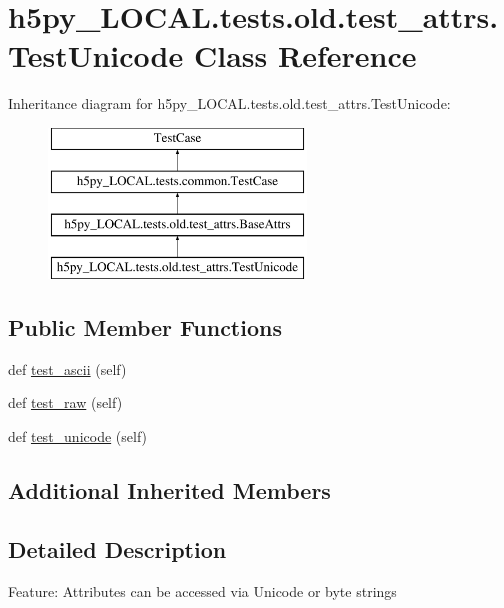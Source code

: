 \hypertarget{classh5py__LOCAL_1_1tests_1_1old_1_1test__attrs_1_1TestUnicode}{}\section{h5py\+\_\+\+L\+O\+C\+A\+L.\+tests.\+old.\+test\+\_\+attrs.\+Test\+Unicode Class Reference}
\label{classh5py__LOCAL_1_1tests_1_1old_1_1test__attrs_1_1TestUnicode}
Inheritance diagram for h5py\+\_\+\+L\+O\+C\+A\+L.\+tests.\+old.\+test\+\_\+attrs.\+Test\+Unicode\+:\begin{figure}[H]
\begin{center}
\leavevmode
\includegraphics[height=4.000000cm]{classh5py__LOCAL_1_1tests_1_1old_1_1test__attrs_1_1TestUnicode}
\end{center}
\end{figure}
\subsection*{Public Member Functions}
\begin{DoxyCompactItemize}
\item 
def \hyperlink{classh5py__LOCAL_1_1tests_1_1old_1_1test__attrs_1_1TestUnicode_a189654c1ae6760256cca4e8e3fdc5495}{test\+\_\+ascii} (self)
\item 
def \hyperlink{classh5py__LOCAL_1_1tests_1_1old_1_1test__attrs_1_1TestUnicode_aac970736ab9c2e8dd90d5afc500c8245}{test\+\_\+raw} (self)
\item 
def \hyperlink{classh5py__LOCAL_1_1tests_1_1old_1_1test__attrs_1_1TestUnicode_a377e19245412a821912406c9d54c92cd}{test\+\_\+unicode} (self)
\end{DoxyCompactItemize}
\subsection*{Additional Inherited Members}


\subsection{Detailed Description}
\begin{DoxyVerb}    Feature: Attributes can be accessed via Unicode or byte strings
\end{DoxyVerb}
 

